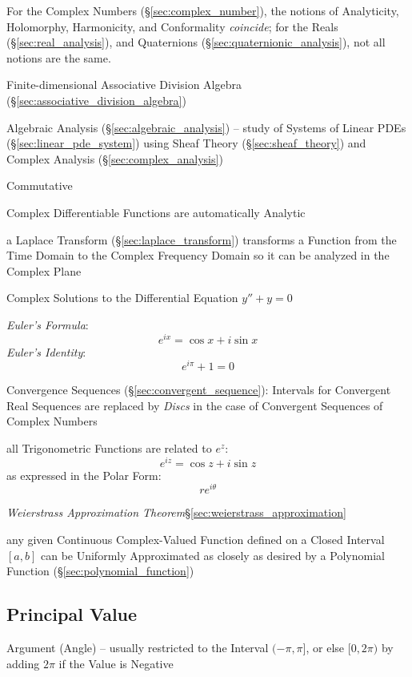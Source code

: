 For the Complex Numbers (\S\ref{sec:complex_number}), the notions of
Analyticity, Holomorphy, Harmonicity, and Conformality \emph{coincide}; for the
Reals (\S\ref{sec:real_analysis}), and Quaternions
(\S\ref{sec:quaternionic_analysis}), not all notions are the same.

Finite-dimensional Associative Division Algebra
(\S\ref{sec:associative_division_algebra})

\fist Algebraic Analysis (\S\ref{sec:algebraic_analysis}) -- study of Systems of
Linear PDEs (\S\ref{sec:linear_pde_system}) using Sheaf Theory
(\S\ref{sec:sheaf_theory}) and Complex Analysis (\S\ref{sec:complex_analysis})

Commutative

Complex Differentiable Functions are automatically Analytic %

a Laplace Transform (\S\ref{sec:laplace_transform}) transforms a Function from
the Time Domain to the Complex Frequency Domain so it can be analyzed in the
Complex Plane

Complex Solutions to the Differential Equation $y'' + y = 0$

\emph{Euler's Formula}:
\[
  e^{ix} = \cos x + i \sin x
\]
\emph{Euler's Identity}:
\[
  e^{i\pi} + 1 = 0
\]

Convergence Sequences (\S\ref{sec:convergent_sequence}): Intervals
for Convergent Real Sequences are replaced by \emph{Discs} in the case of
Convergent Sequences of Complex Numbers

all Trigonometric Functions are related to $e^z$:
\[
  e^{iz} = \cos z + i \sin z
\]
as expressed in the Polar Form:
\[
  re^{i\theta}
\]


\emph{Weierstrass Approximation Theorem}\S\ref{sec:weierstrass_approximation}

any given Continuous Complex-Valued Function defined on a Closed Interval
$[a,b]$ can be Uniformly Approximated as closely as desired by a Polynomial
Function (\S\ref{sec:polynomial_function})



\subsection{Principal Value}\label{sec:principal_value}

Argument (Angle) -- usually restricted to the Interval $(-\pi,\pi]$, or else
$[0,2\pi)$ by adding $2\pi$ if the Value is Negative



